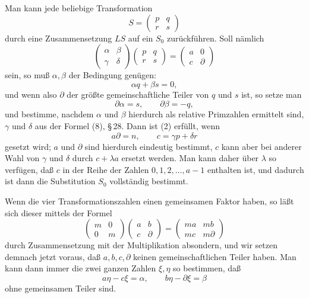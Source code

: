 \documentclass[11pt]{article}
\begin{document}
Man kann jede beliebige Transformation
\[
S=\begin{pmatrix}p&q\\ r&s\end{pmatrix}
\]
durch eine Zusammensetzung $LS$ auf ein $S_0$ zurückführen. Soll nämlich
\begin{equation}
\begin{pmatrix}\alpha&\beta\\ \gamma&\delta\end{pmatrix}
\begin{pmatrix}p&q\\ r&s\end{pmatrix}
=\begin{pmatrix}a&0\\ c&\partial\end{pmatrix} \tag{2}
\end{equation}
sein, so muß $\alpha,\beta$ der Bedingung genügen:
\[
\alpha q+\beta s=0,
\]
und wenn also $\partial$ der größte gemeinschaftliche Teiler von $q$ und $s$ ist, so setze man
\[
\partial\alpha=s,
\qquad
\partial\beta=-q,
\]
und bestimme, nachdem $\alpha$ und $\beta$ hierdurch als relative Primzahlen ermittelt sind, $\gamma$ und $\delta$ aus der Formel (8), \S\,28. Dann ist (2) erfüllt, wenn
\[
a\partial=n,
\qquad
c=\gamma p+\delta r
\]
gesetzt wird; $a$ und $\partial$ sind hierdurch eindeutig bestimmt, $c$ kann aber bei anderer Wahl von $\gamma$ und $\delta$ durch $c+\lambda a$ ersetzt werden. Man kann daher über $\lambda$ so verfügen, daß $c$ in der Reihe der Zahlen $0,1,2,\ldots,a-1$ enthalten ist, und dadurch ist dann die Substitution $S_0$ vollständig bestimmt.

Wenn die vier Transformationszahlen einen gemeinsamen Faktor haben, so läßt sich dieser mittels der Formel
\[
\begin{pmatrix}m&0\\0&m\end{pmatrix}
\begin{pmatrix}a&b\\c&\partial\end{pmatrix}
=\begin{pmatrix}ma&mb\\mc&m\partial\end{pmatrix}
\]
durch Zusammensetzung mit der Multiplikation absondern, und wir setzen demnach jetzt voraus, daß $a,b,c,\partial$ keinen gemeinschaftlichen Teiler haben. Man kann dann immer die zwei ganzen Zahlen $\xi,\eta$ so bestimmen, daß
\begin{equation}
a\eta-c\xi=\alpha,
\qquad
b\eta-\partial\xi=\beta \tag{3}
\end{equation}
ohne gemeinsamen Teiler sind.
\end{document}
